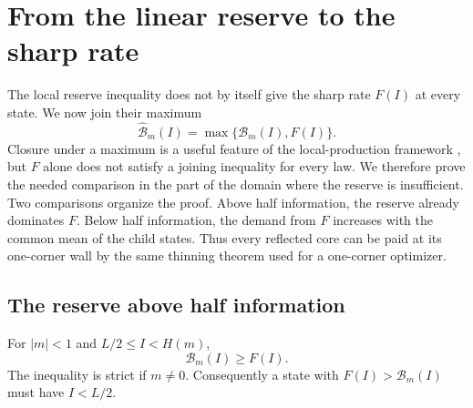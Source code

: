 \section{From the linear reserve to the sharp rate}
\label{upgrade:section}

The local reserve inequality does not by itself give the sharp rate
$F(I)$ at every state. We now join their maximum
\[
 \widehat{\mathcal B}_m(I)
 =\max\{\mathcal B_m(I),F(I)\}.
\]
Closure under a maximum is a useful feature of the local-production
framework \cite[Lemma~3]{ChenGohariNair2025}, but $F$ alone does not
satisfy a joining inequality for every law. We therefore prove the
needed comparison in the part of the domain where the reserve is
insufficient. Two comparisons organize the proof. Above half information, the
reserve already dominates $F$. Below half information, the demand
from $F$ increases with the common mean of the child states. Thus
every reflected core can be paid at its one-corner wall by the same
thinning theorem used for a one-corner optimizer.

\subsection{The reserve above half information}

\begin{lemma}
\label{upgrade:high-information}
For $|m|<1$ and $L/2\le I<H(m)$,
\begin{equation}
 \mathcal B_m(I)\ge F(I).
 \label{upgrade:high-information-bound}
\end{equation}
The inequality is strict if $m\ne0$. Consequently a state with
$F(I)>\mathcal B_m(I)$ must have $I<L/2$.
\end{lemma}

